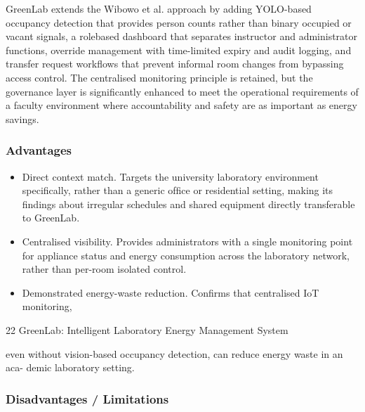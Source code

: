 GreenLab extends the Wibowo et al. approach by adding YOLO-based occupancy
detection that provides person counts rather than binary occupied or vacant signals, a rolebased dashboard that separates instructor and administrator functions, override management with time-limited expiry and audit logging, and transfer request workﬂows that prevent informal room changes from bypassing access control. The centralised monitoring
principle is retained, but the governance layer is signiﬁcantly enhanced to meet the operational requirements of a faculty environment where accountability and safety are as important as energy savings.



\subsubsection*{Advantages}



\begin{itemize}
  \item Direct context match. Targets the university laboratory environment speciﬁcally,
rather than a generic ofﬁce or residential setting, making its ﬁndings about irregular
schedules and shared equipment directly transferable to GreenLab.
\end{itemize}

\begin{itemize}
  \item Centralised visibility. Provides administrators with a single monitoring point for
appliance status and energy consumption across the laboratory network, rather than
per-room isolated control.
\end{itemize}

\begin{itemize}
  \item Demonstrated energy-waste reduction. Conﬁrms that centralised IoT monitoring,
\end{itemize}

22
GreenLab: Intelligent Laboratory Energy Management System


even without vision-based occupancy detection, can reduce energy waste in an aca-
demic laboratory setting.



\subsubsection*{Disadvantages / Limitations}



